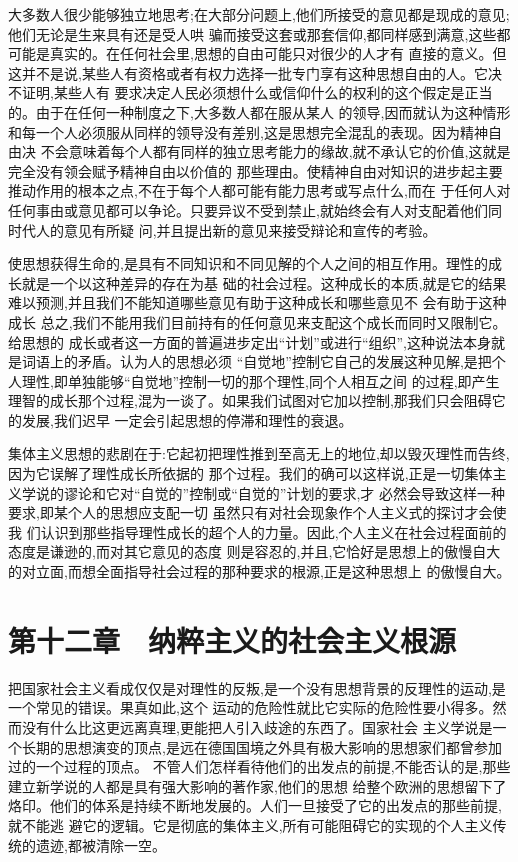﻿\documentclass[12pt]{article}
\begin{document}
大多数人很少能够独立地思考;在大部分问题上,他们所接受的意见都是现成的意见;他们无论是生来具有还是受人哄
骗而接受这套或那套信仰,都同样感到满意,这些都可能是真实的。在任何社会里,思想的自由可能只对很少的人才有
直接的意义。但这并不是说,某些人有资格或者有权力选择一批专门享有这种思想自由的人。它决不证明,某些人有
要求决定人民必须想什么或信仰什么的权利的这个假定是正当的。由于在任何一种制度之下,大多数人都在服从某人
的领导,因而就认为这种情形和每一个人必须服从同样的领导没有差别,这是思想完全混乱的表现。因为精神自由决
不会意味着每个人都有同样的独立思考能力的缘故,就不承认它的价值,这就是完全没有领会赋予精神自由以价值的
那些理由。使精神自由对知识的进步起主要推动作用的根本之点,不在于每个人都可能有能力思考或写点什么,而在
于任何人对任何事由或意见都可以争论。只要异议不受到禁止,就始终会有人对支配着他们同时代人的意见有所疑
问,并且提出新的意见来接受辩论和宣传的考验。

使思想获得生命的,是具有不同知识和不同见解的个人之间的相互作用。理性的成长就是一个以这种差异的存在为基
础的社会过程。这种成长的本质,就是它的结果难以预测,并且我们不能知道哪些意见有助于这种成长和哪些意见不
会有助于这种成长 \myrule 总之,我们不能用我们目前持有的任何意见来支配这个成长而同时又限制它。给思想的
成长或者这一方面的普遍进步定出``计划''或进行``组织'',这种说法本身就是词语上的矛盾。认为人的思想必须
``自觉地''控制它自己的发展这种见解,是把个人理性,即单独能够``自觉地''控制一切的那个理性,同个人相互之间
的过程,即产生理智的成长那个过程,混为一谈了。如果我们试图对它加以控制,那我们只会阻碍它的发展,我们迟早
一定会引起思想的停滞和理性的衰退。

集体主义思想的悲剧在于:它起初把理性推到至高无上的地位,却以毁灭理性而告终,因为它误解了理性成长所依据的
那个过程。我们的确可以这样说,正是一切集体主义学说的谬论和它对``自觉的''控制或``自觉的''计划的要求,才
必然会导致这样一种要求,即某个人的思想应支配一切 \myrule 虽然只有对社会现象作个人主义式的探讨才会使我
们认识到那些指导理性成长的超个人的力量。因此,个人主义在社会过程面前的态度是谦逊的,而对其它意见的态度
则是容忍的,并且,它恰好是思想上的傲慢自大的对立面,而想全面指导社会过程的那种要求的根源,正是这种思想上
的傲慢自大。



\section{第十二章　纳粹主义的社会主义根源}


把国家社会主义看成仅仅是对理性的反叛,是一个没有思想背景的反理性的运动,是一个常见的错误。果真如此,这个
运动的危险性就比它实际的危险性要小得多。然而没有什么比这更远离真理,更能把人引入歧途的东西了。国家社会
主义学说是一个长期的思想演变的顶点,是远在德国国境之外具有极大影响的思想家们都曾参加过的一个过程的顶点。
不管人们怎样看待他们的出发点的前提,不能否认的是,那些建立新学说的人都是具有强大影响的著作家,他们的思想
给整个欧洲的思想留下了烙印。他们的体系是持续不断地发展的。人们一旦接受了它的出发点的那些前提,就不能逃
避它的逻辑。它是彻底的集体主义,所有可能阻碍它的实现的个人主义传统的遗迹,都被清除一空。
\end{document}
